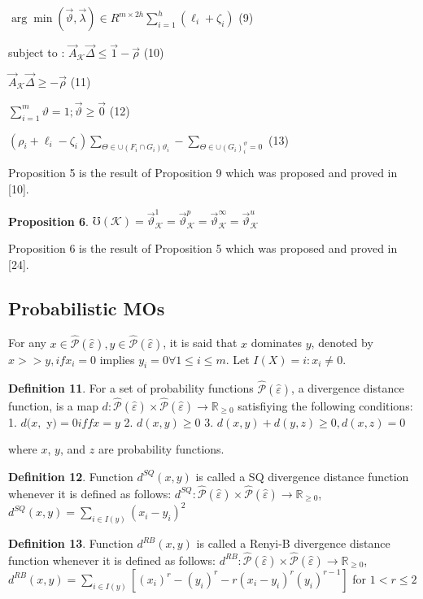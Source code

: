 \documentclass[]{iosart2c}
\begin{document}
$\arg \min(\vec{\vartheta},\vec{\lambda})\in R^{m \times 2h}\sum^h_{i=1}(\ell_i + \zeta_i)$ (9)

subject to : $\vec{A}_\mathcal{K} \vec{\Delta} \le \vec{1} - \vec{\rho}$ (10)

$\vec{A}_\mathcal{K} \vec\Delta\geq -\vec{\rho}$ (11)

$\sum^m_{i=1} \vartheta = 1;\vec{\vartheta}\geq\vec{0}$ (12)

$(\rho_i + \ell_i - \zeta_i)\sum_{\Theta \in \cup(F_i \cap G_i)\vartheta_i} - \sum_{\Theta\in\cup(G_i)^\vartheta_i=0}$ (13)

Proposition 5 is the result of Proposition 9 which  was proposed and proved in [10].

\textbf{Proposition 6}. $\mho(\mathcal{K}) = \vec{\vartheta}^1_\mathcal{K} = \vec{\vartheta}^p_\mathcal{K} = \vec{\vartheta}^\infty_\mathcal{K} = \vec{\vartheta}^u_\mathcal{K}$

Proposition 6 is the result of Proposition 5 which was proposed and proved in [24].

\subsection{Probabilistic MOs}

For any $x \in \hat{\mathcal{P}}(\hat{\varepsilon}), y \in \hat{\mathcal{P}}(\hat{\varepsilon})$, it is said that $x$ dominates $y$, denoted by $x >> y, if x_i = 0$ implies $y_i = 0 \forall 1 \le i \le m$. Let $I(X) = {i : x_i \neq 0}$. 

\textbf{Definition 11}. For a set of probability functions $\hat{\mathcal{P}} (\hat{\varepsilon})$, a divergence distance function, is a map $d : \hat{\mathcal{P}} (\hat{\varepsilon}) \times \hat{\mathcal{P}} (\hat{\varepsilon}) \to \mathbb{R}_{\geq0}$ satisfiying the following conditions: 
1. $d(x,$ y$) = 0 iff x = y$ 
2. $d(x, y) \geq 0$
3. $d(x, y) + d(y, z)\ge0, d(x, z) = 0$

where $x$, $y$, and $z$ are probability functions. 

\textbf{Definition 12}. Function $d^{SQ}(x, y)$ is called a SQ divergence distance function whenever it is defined as follows: $d^{SQ} : \hat{\mathcal{P}} (\hat{\varepsilon}) \times \hat{\mathcal{P}} (\hat{\varepsilon}) \to \mathbb{R}_{\geq0}$, $d^{SQ}(x, y) = \sum_{i \in I(y)} (x_i - y_i)^2$

\textbf{Definition 13}. Function $d^{RB}(x, y)$ is called a Renyi-B divergence distance function whenever it is defined as follows: $d^{RB} : \hat{\mathcal{P}}(\hat{\varepsilon}) \times \hat{\mathcal{P}} (\hat{\varepsilon}) \to \mathbb{R}_{\ge 0}$, $d^{RB}(x, y)=\sum_{i\in I(y)}[(x_i)^r - (y_i)^r - r(x_i - y_i)^r(y_i)^{r-1}]$ for $1 < r \le 2$
 
\end{document}
